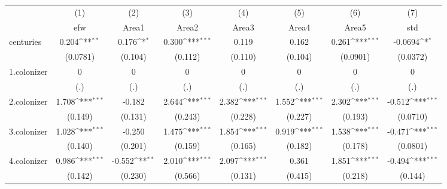 {
\def\sym#1{\ifmmode^{#1}\else\(^{#1}\)\fi}
\begin{tabular}{l*{7}{c}}
\hline\hline
            &\multicolumn{1}{c}{(1)}&\multicolumn{1}{c}{(2)}&\multicolumn{1}{c}{(3)}&\multicolumn{1}{c}{(4)}&\multicolumn{1}{c}{(5)}&\multicolumn{1}{c}{(6)}&\multicolumn{1}{c}{(7)}\\
            &\multicolumn{1}{c}{efw}&\multicolumn{1}{c}{Area1}&\multicolumn{1}{c}{Area2}&\multicolumn{1}{c}{Area3}&\multicolumn{1}{c}{Area4}&\multicolumn{1}{c}{Area5}&\multicolumn{1}{c}{std}\\
\hline
centuries   &       0.204\sym{**} &       0.176\sym{*}  &       0.300\sym{***}&       0.119         &       0.162         &       0.261\sym{***}&     -0.0694\sym{*}  \\
            &    (0.0781)         &     (0.104)         &     (0.112)         &     (0.110)         &     (0.104)         &    (0.0901)         &    (0.0372)         \\
[1em]
1.colonizer &           0         &           0         &           0         &           0         &           0         &           0         &           0         \\
            &         (.)         &         (.)         &         (.)         &         (.)         &         (.)         &         (.)         &         (.)         \\
[1em]
2.colonizer &       1.708\sym{***}&      -0.182         &       2.644\sym{***}&       2.382\sym{***}&       1.552\sym{***}&       2.302\sym{***}&      -0.512\sym{***}\\
            &     (0.149)         &     (0.131)         &     (0.243)         &     (0.228)         &     (0.227)         &     (0.193)         &    (0.0710)         \\
[1em]
3.colonizer &       1.028\sym{***}&      -0.250         &       1.475\sym{***}&       1.854\sym{***}&       0.919\sym{***}&       1.538\sym{***}&      -0.471\sym{***}\\
            &     (0.140)         &     (0.201)         &     (0.159)         &     (0.165)         &     (0.182)         &     (0.178)         &    (0.0801)         \\
[1em]
4.colonizer &       0.986\sym{***}&      -0.552\sym{**} &       2.010\sym{***}&       2.097\sym{***}&       0.361         &       1.851\sym{***}&      -0.494\sym{***}\\
            &     (0.142)         &     (0.230)         &     (0.566)         &     (0.131)         &     (0.415)         &     (0.218)         &     (0.144)         \\

\end{tabular}}
